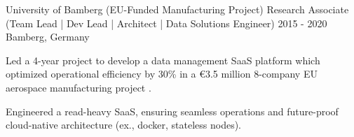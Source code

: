 \begin{cventries}

    
        
  \cventry
    {University of Bamberg (EU-Funded Manufacturing Project)} %
    {Research Associate (Team Lead | Dev Lead | Architect | Data Solutions Engineer)} %
    {2015 - 2020} %
    {Bamberg, Germany} %
    {
      \begin{cvitems} %
		\item {Led a 4-year project to develop a data management SaaS platform which optimized operational efficiency by 30\% in a €3.5 million 8-company EU aerospace manufacturing project .}
		\item {Engineered a read-heavy SaaS, ensuring seamless operations and future-proof cloud-native architecture (ex., docker, stateless nodes).}
      \end{cvitems}
    }
    







\end{cventries}
